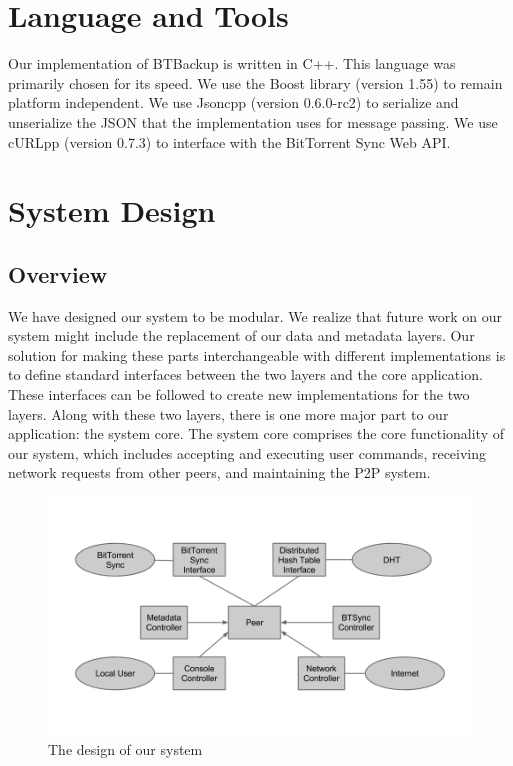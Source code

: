 \documentclass[12pt]{report}
\begin{document}
\section{Language and Tools}

Our implementation of BTBackup is written in C++. This language was primarily chosen for its speed. We use the Boost library (version 1.55) to remain platform independent. We use Jsoncpp (version 0.6.0-rc2) to serialize and unserialize the JSON that the implementation uses for message passing. We use cURLpp (version 0.7.3) to interface with the BitTorrent Sync Web API.

\section{System Design}
\subsection{Overview} \label{subsec:Overview_sec:SystemDesign_chap:Implementation}

We have designed our system to be modular. We realize that future work on our system might include the replacement of our data and metadata layers. Our solution for making these parts interchangeable with different implementations is to define standard interfaces between the two layers and the core application. These interfaces can be followed to create new implementations for the two layers. Along with these two layers, there is one more major part to our application: the system core. The system core comprises the core functionality of our system, which includes accepting and executing user commands, receiving network requests from other peers, and maintaining the P2P system.

\begin{figure}
  \centering
  \includegraphics[scale=0.4]{figures/SystemDesign}
  \caption{The design of our system \label{fig:SystemDesign}}
\end{figure}
\end{document}
